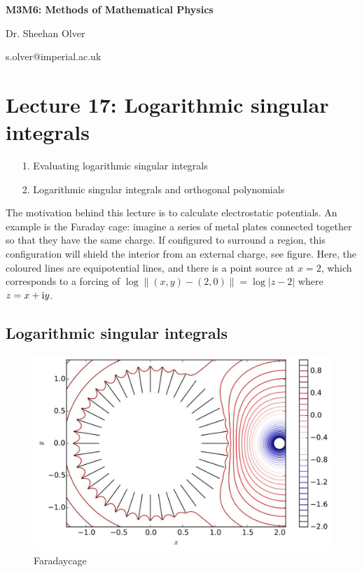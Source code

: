 \documentclass[12pt,a4paper]{article}
\def\I{ {\rm i} }
\begin{document}
\textbf{M3M6: Methods of Mathematical Physics}

Dr. Sheehan Olver

s.olver@imperial.ac.uk

\section{Lecture 17: Logarithmic singular integrals}
\begin{itemize}
\item[1. ] Evaluating logarithmic singular integrals


\item[2. ] Logarithmic singular integrals and orthogonal polynomials

\end{itemize}
The motivation behind this lecture is to calculate electrostatic potentials.  An example is the Faraday cage: imagine a series of metal plates connected together so that they have the same charge.  If configured to surround a region, this configuration will shield the interior from an external charge, see figure. Here, the coloured lines are equipotential lines, and there is a point source at $x = 2$, which corresponds to a forcing of  $\log\| (x,y)  - (2,0) \| = \log|z - 2|$ where  $z = x + \I y$. 

\subsection{Logarithmic singular integrals}
\begin{figure}
\centering
\includegraphics{Laplacetangentialplot.pdf}
\caption{Faradaycage}
\end{figure}
\end{document}
